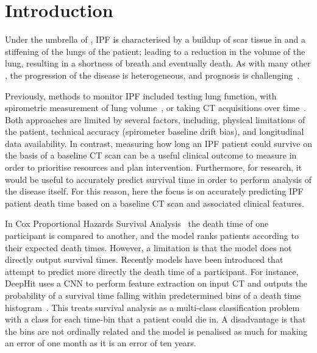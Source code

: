     \section{Introduction} \label{sec:deep_learning_for_ct_based_survival_analysis_of_idiopathic_pulmonary_fibrosis_patients_appendix_introduction}
        Under the umbrella of , \gls{IPF} is  characterised by a buildup of scar tissue in and a stiffening of the lungs of the patient; leading to a reduction in the volume of the lung, resulting in a shortness of breath and eventually death. As with many other , the progression of the disease is heterogeneous, and prognosis is challenging~\parencite{King2011IdiopathicFibrosis}.
        
        Previously, methods to monitor \gls{IPF} included testing lung function, with spirometric measurement of lung volume~\parencite{Watters1986AFibrosis}, or taking \gls{CT} acquisitions over time~\parencite{Lynch2018DiagnosticPaper}. Both approaches are limited by several factors, including, physical limitations of the patient, technical accuracy (spirometer baseline drift bias), and  longitudinal data availability. In contrast, measuring how long an \gls{IPF} patient could survive on the basis of a baseline \gls{CT} scan can be a useful clinical outcome to measure in order to prioritise resources and plan intervention. Furthermore, for research, it would be useful to accurately predict survival time in order to perform analysis of the disease itself. For this reason, here the focus is on accurately predicting \gls{IPF} patient death time based on a baseline \gls{CT} scan and associated clinical features.
    
        In Cox Proportional Hazards Survival Analysis~\parencite{Cox1972RegressionLife-Tables} the death time of one participant is compared to another, and the model ranks patients according to their expected death times. However, a limitation is that the model does not directly output survival times. Recently models have been introduced that attempt to predict more directly the death time of a participant. For instance, DeepHit uses a \gls{CNN} to perform feature extraction on input \gls{CT} and outputs the probability of a survival time falling within predetermined bins of a death time histogram~\parencite{Lee2018DeepHit:Risks}. This treats survival analysis as a multi-class classification problem with a class for each time-bin that a patient could die in. A disadvantage is that the bins are not ordinally related and the model is penalised as much for making an error of one month as it is an error of ten years.
    
